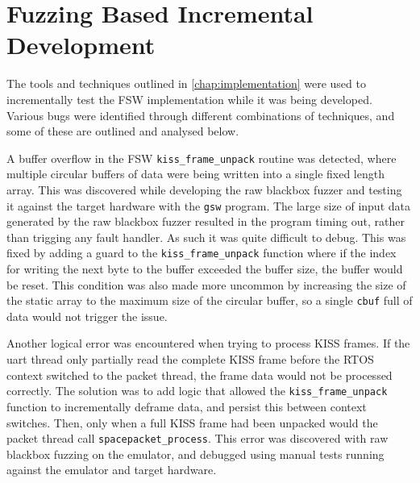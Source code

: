 \documentclass[../report.tex]{subfiles}
\begin{document}
\section{Fuzzing Based Incremental Development}

The tools and techniques outlined in \autoref{chap:implementation} were used to
incrementally test the FSW implementation while it was being developed. Various
bugs were identified through different combinations of techniques, and some of
these are outlined and analysed below.

A buffer overflow in the FSW \lstinline|kiss_frame_unpack| routine was
detected, where multiple circular buffers of data were being written into a
single fixed length array. This was discovered while developing the raw
blackbox fuzzer and testing it against the target hardware with the
\lstinline|gsw| program. The large size of input data generated by the raw
blackbox fuzzer resulted in the program timing out, rather than trigging any
fault handler. As such it was quite difficult to debug. This was fixed by
adding a guard to the \lstinline|kiss_frame_unpack| function where if the index
for writing the next byte to the buffer exceeded the buffer size, the buffer
would be reset. This condition was also made more uncommon by increasing the
size of the static array to the maximum size of the circular buffer, so a
single \lstinline|cbuf| full of data would not trigger the issue.

Another logical error was encountered when trying to process KISS frames. If
the uart thread only partially read the complete KISS frame before the
RTOS context switched to the packet thread, the frame data would not be
processed correctly. The solution was to add logic that allowed the
\lstinline|kiss_frame_unpack| function to incrementally deframe data, and
persist this between context switches. Then, only when a full KISS frame had
been unpacked would the packet thread call \lstinline|spacepacket_process|.
This error was discovered with raw blackbox fuzzing on the emulator, and
debugged using manual tests running against the emulator and target hardware.
\end{document}
